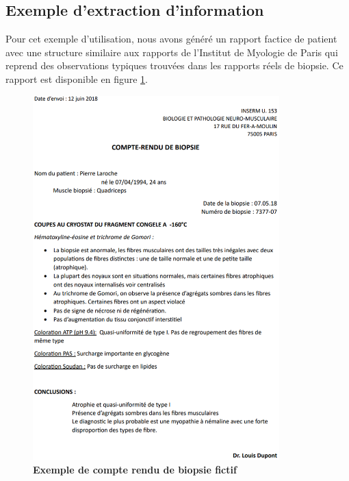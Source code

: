 \subsection{Exemple d'extraction d'information}
Pour cet exemple d'utilisation, nous avons généré un rapport factice de patient avec une structure similaire aux rapports de l'Institut de Myologie de Paris qui reprend des observations typiques trouvées dans les rapports réels de biopsie. Ce rapport est disponible en figure \ref{fig:factice_report}. 
\begin{figure}[!ht]
 \centering
 \includegraphics[width=0.85\textwidth]{figures/pdf_biopsie.png}
 \caption[Compte rendus de biopsie fictif]{\textbf{Exemple de compte rendu de biopsie fictif}}
 \label{fig:factice_report}
\end{figure}

